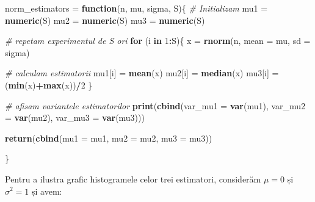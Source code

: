 \documentclass[
]{article}
\newenvironment{Shaded}{\begin{snugshade}}{\end{snugshade}}
\newcommand{\CommentTok}[1]{\textcolor[rgb]{0.56,0.35,0.01}{\textit{#1}}}
\newcommand{\ControlFlowTok}[1]{\textcolor[rgb]{0.13,0.29,0.53}{\textbf{#1}}}
\newcommand{\DataTypeTok}[1]{\textcolor[rgb]{0.13,0.29,0.53}{#1}}
\newcommand{\DecValTok}[1]{\textcolor[rgb]{0.00,0.00,0.81}{#1}}
\newcommand{\KeywordTok}[1]{\textcolor[rgb]{0.13,0.29,0.53}{\textbf{#1}}}
\newcommand{\NormalTok}[1]{#1}
\newcommand{\OperatorTok}[1]{\textcolor[rgb]{0.81,0.36,0.00}{\textbf{#1}}}
\newcommand{\StringTok}[1]{\textcolor[rgb]{0.31,0.60,0.02}{#1}}
\begin{document}
\begin{Shaded}
\begin{Highlighting}[]
\NormalTok{norm_estimators =}\StringTok{ }\ControlFlowTok{function}\NormalTok{(n, mu, sigma, S)\{}
  \CommentTok{# Initializam}
\NormalTok{  mu1 =}\StringTok{ }\KeywordTok{numeric}\NormalTok{(S)}
\NormalTok{  mu2 =}\StringTok{ }\KeywordTok{numeric}\NormalTok{(S)}
\NormalTok{  mu3 =}\StringTok{ }\KeywordTok{numeric}\NormalTok{(S)}
  
  \CommentTok{# repetam experimentul de S ori}
  \ControlFlowTok{for}\NormalTok{ (i }\ControlFlowTok{in} \DecValTok{1}\OperatorTok{:}\NormalTok{S)\{}
\NormalTok{    x =}\StringTok{ }\KeywordTok{rnorm}\NormalTok{(n, }\DataTypeTok{mean =}\NormalTok{ mu, }\DataTypeTok{sd =}\NormalTok{ sigma)}
    
    \CommentTok{# calculam estimatorii}
\NormalTok{    mu1[i] =}\StringTok{ }\KeywordTok{mean}\NormalTok{(x)}
\NormalTok{    mu2[i] =}\StringTok{ }\KeywordTok{median}\NormalTok{(x)}
\NormalTok{    mu3[i] =}\StringTok{ }\NormalTok{(}\KeywordTok{min}\NormalTok{(x)}\OperatorTok{+}\KeywordTok{max}\NormalTok{(x))}\OperatorTok{/}\DecValTok{2}
\NormalTok{  \}}
  
  \CommentTok{# afisam variantele estimatorilor }
  \KeywordTok{print}\NormalTok{(}\KeywordTok{cbind}\NormalTok{(}\DataTypeTok{var_mu1 =} \KeywordTok{var}\NormalTok{(mu1), }\DataTypeTok{var_mu2 =} \KeywordTok{var}\NormalTok{(mu2), }\DataTypeTok{var_mu3 =} \KeywordTok{var}\NormalTok{(mu3)))}
  
 \KeywordTok{return}\NormalTok{(}\KeywordTok{cbind}\NormalTok{(}\DataTypeTok{mu1 =}\NormalTok{ mu1, }\DataTypeTok{mu2 =}\NormalTok{ mu2, }\DataTypeTok{mu3 =}\NormalTok{ mu3))}
  
\NormalTok{\}}
\end{Highlighting}
\end{Shaded}

Pentru a ilustra grafic histogramele celor trei estimatori, considerăm
\(\mu = 0\) și \(\sigma^2 = 1\) și avem:
\end{document}
